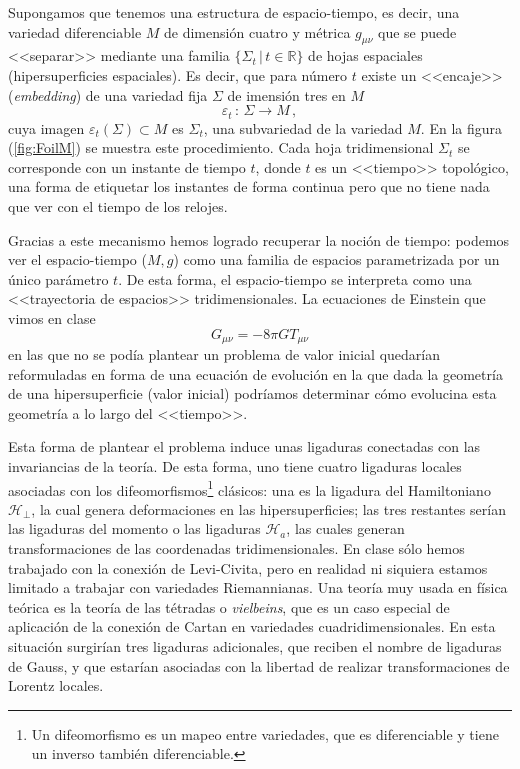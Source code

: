 \documentclass[11pt,a4paper,titlepage]{article}
\begin{document}
Supongamos que tenemos una estructura de espacio-tiempo, es decir, una variedad diferenciable $M$ de dimensión cuatro y métrica $g_{\mu\nu}$ que se puede <<separar>> mediante una familia $\{\Sigma_t\,|\,t\in\mathbb{R}\}$ de hojas espaciales (hipersuperficies espaciales). Es decir, que para número $t$ existe un <<encaje>> (\emph{embedding}) de una variedad fija $\Sigma$ de imensión tres en $M$
\begin{equation*}
 \varepsilon_t\,:\,\Sigma\rightarrow M\,,
\end{equation*}
cuya imagen $\varepsilon_t(\Sigma)\subset M$ es $\Sigma_t$, una subvariedad de la variedad $M$. En la figura (\ref{fig:FoilM}) se muestra este procedimiento. Cada hoja tridimensional $\Sigma_t$ se corresponde con un instante de tiempo $t$, donde $t$ es un <<tiempo>> topológico, una forma de etiquetar los instantes de forma continua pero que no tiene nada que ver con el tiempo de los relojes.

Gracias a este mecanismo hemos logrado recuperar la noción de tiempo: podemos ver el espacio-tiempo ($M,g$) como una familia de espacios parametrizada por un único parámetro $t$. De esta forma, el espacio-tiempo se interpreta como una <<trayectoria de espacios>> tridimensionales. La ecuaciones de Einstein que vimos en clase
\begin{equation*}
 G_{\mu\nu}=-8\pi GT_{\mu\nu}
\end{equation*}
en las que no se podía plantear un problema de valor inicial quedarían reformuladas en forma de una ecuación de evolución en la que dada la geometría de una hipersuperficie (valor inicial) podríamos determinar cómo evolucina esta geometría a lo largo del <<tiempo>>.

Esta forma de plantear el problema induce unas ligaduras conectadas con las invariancias de la teoría. De esta forma, uno tiene cuatro ligaduras locales asociadas con los difeomorfismos\footnote{Un difeomorfismo \cite{difeomorfismo} es un mapeo entre variedades, que es diferenciable y tiene un inverso también diferenciable.} clásicos: una es la ligadura del Hamiltoniano $\mathscr{H}_\perp$, la cual genera deformaciones en las hipersuperficies; las tres restantes serían las ligaduras del momento o las ligaduras $\mathscr{H}_a$, las cuales generan transformaciones de las coordenadas tridimensionales. En clase sólo hemos trabajado con la conexión de Levi-Civita, pero en realidad ni siquiera estamos limitado a trabajar con variedades Riemannianas. Una teoría muy usada en física teórica es la teoría de las tétradas o \emph{vielbeins}, que es un caso especial de aplicación de la conexión de Cartan en variedades cuadridimensionales. En esta situación surgirían tres ligaduras adicionales, que reciben el nombre de ligaduras de Gauss, y que estarían asociadas con la libertad de realizar transformaciones de Lorentz locales.
\end{document}
